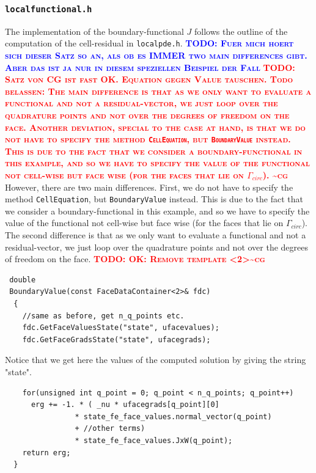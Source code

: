 \documentclass[prodmode,acmtoms]{acmsmall}
\numberwithin{equation}{section}
\newcommand{\todo}[1]{\textbf{\textsc{\textcolor{blue}{TODO: #1}}}}
\newcommand{\todocg}[1]{\textbf{\textsc{\textcolor{red}{TODO: #1\textasciitilde cg}}}}
\begin{document}
\subsubsection{\texttt{localfunctional.h}}
The implementation of the boundary-functional $J$ follows the outline of the
computation of the cell-residual in \texttt{localpde.h}. 
\todo{Fuer mich hoert sich dieser Satz so an, als ob es IMMER two main
  differences gibt. Aber das ist ja nur in diesem speziellen Beispiel der Fall}
  \todocg{Satz von CG ist fast OK. Equation gegen Value tauschen. Todo belassen: The main difference is that as we only want to evaluate a functional and not a residual-vector, we just loop over the quadrature points and not over the degrees of freedom on the face. Another deviation, special to the case at hand, is that we do not have to specify the method \texttt{CellEquation}, but \texttt{BoundaryValue} instead. This is due to the fact that we consider a boundary-functional in this example, and so we have to specify the value of the functional not cell-wise but face wise (for the faces that lie on $\Gamma_{circ}$). }
However, there are two main differences. First, we do not have to specify the method \texttt{CellEquation}, but \texttt{BoundaryValue} instead. This is due to the fact that we consider a boundary-functional in this example, and so we have to specify the value of the functional not cell-wise but face wise (for the faces that lie on $\Gamma_{circ}$). The second difference is that as we only want to evaluate a functional and not a residual-vector, we just loop over the quadrature points and not over the degrees of freedom on the face.
\todocg{OK: Remove template <2>}
\begin{lstlisting}
 double
 BoundaryValue(const FaceDataContainer<2>& fdc)
  {
    //same as before, get n_q_points etc.
    fdc.GetFaceValuesState("state", ufacevalues);
    fdc.GetFaceGradsState("state", ufacegrads);
\end{lstlisting}
Notice that we get here the values of the computed solution by giving the string "state".
\begin{lstlisting}
    for(unsigned int q_point = 0; q_point < n_q_points; q_point++)
      erg += -1. * ( _nu * ufacegrads[q_point][0]
                * state_fe_face_values.normal_vector(q_point)
                + //other terms)        
                * state_fe_face_values.JxW(q_point);
    return erg;
  }
\end{lstlisting}
\end{document}
